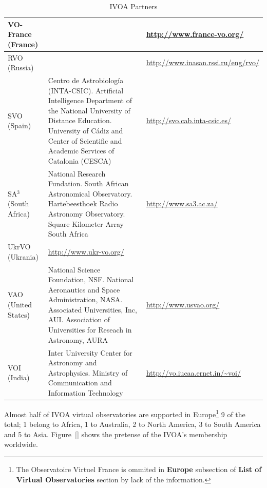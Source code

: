 \begin{table}[h!t]
\begin{tabular}{|l|p{9cm}|l|}
	\hline
	VO-France (France) & & \url{http://www.france-vo.org/} \\
	\hline
	RVO (Russia) & & \url{http://www.inasan.rssi.ru/eng/rvo/} \\
	\hline
	SVO (Spain) & Centro de Astrobiología (INTA-CSIC). Artificial Intelligence Department of the National University of Distance Education. University of Cádiz and Center of Scientific and Academic Services of Catalonia (CESCA) & \url{http://svo.cab.inta-csic.es/} \\
	\hline
	SA$^3$ (South Africa) & National Research Fundation. South African Astronomical Observatory. Hartebeesthoek Radio Astronomy Observatory. Square Kilometer Array South Africa & \url{http://www.sa3.ac.za/} \\
	\hline
	UkrVO (Ukrania) & \url{http://www.ukr-vo.org/} \\
	\hline
	VAO (United States) & National Science Foundation, NSF. National Aeronautics and Space Administration, NASA. Associated Universities, Inc, AUI. Association of Universities for Reseach in Astronomy, AURA & \url{http://www.usvao.org/} \\
	\hline
	VOI (India) & Inter University Center for Astronomy and Astrophysics. Ministry of Communication and Information Technology & \url{http://vo.iucaa.ernet.in/~voi/} \\
	\hline
	\end{tabular}
	\caption{IVOA Partners}
	\label{table:partners}
\end{table}

Almost half of IVOA virtual observatories are supported in Europe\footnote{The
Observatoire Virtuel France is ommited in \textbf{Europe} subsection of
\textbf{List of Virtual Observatories} section by lack of the information.} 9 of
the total; 1 belong to Africa, 1 to Australia, 2 to North America, 3 to South
America and 5 to Asia. Figure~\ref{} shows the pretense of the IVOA's membership
worldwide.\\



